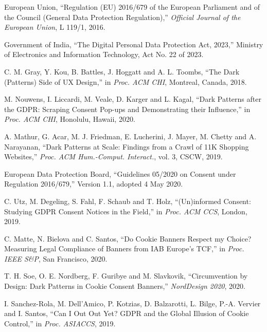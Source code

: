 \documentclass[12pt,a4paper]{report}
\begin{document}
\begin{enumerate}[leftmargin=1.5cm, label={[\arabic*]}]

\item European Union, ``Regulation (EU) 2016/679 of the European Parliament
and of the Council (General Data Protection Regulation),''
\textit{Official Journal of the European Union}, L 119/1, 2016.

\item Government of India, ``The Digital Personal Data Protection Act, 2023,''
Ministry of Electronics and Information Technology, Act No. 22 of 2023.

\item C. M. Gray, Y. Kou, B. Battles, J. Hoggatt and A. L. Toombs,
``The Dark (Patterns) Side of UX Design,''
in \textit{Proc. ACM CHI}, Montreal, Canada, 2018.

\item M. Nouwens, I. Liccardi, M. Veale, D. Karger and L. Kagal,
``Dark Patterns after the GDPR: Scraping Consent Pop-ups and
Demonstrating their Influence,''
in \textit{Proc. ACM CHI}, Honolulu, Hawaii, 2020.

\item A. Mathur, G. Acar, M. J. Friedman, E. Lucherini, J. Mayer,
M. Chetty and A. Narayanan,
``Dark Patterns at Scale: Findings from a Crawl of 11K Shopping Websites,''
\textit{Proc. ACM Hum.-Comput. Interact.}, vol. 3, CSCW, 2019.

\item European Data Protection Board,
``Guidelines 05/2020 on Consent under Regulation 2016/679,''
Version 1.1, adopted 4 May 2020.

\item C. Utz, M. Degeling, S. Fahl, F. Schaub and T. Holz,
``(Un)informed Consent: Studying GDPR Consent Notices in the Field,''
in \textit{Proc. ACM CCS}, London, 2019.

\item C. Matte, N. Bielova and C. Santos,
``Do Cookie Banners Respect my Choice? Measuring Legal Compliance of Banners
from IAB Europe's TCF,''
in \textit{Proc. IEEE S\&P}, San Francisco, 2020.

\item T. H. Soe, O. E. Nordberg, F. Guribye and M. Slavkovik,
``Circumvention by Design: Dark Patterns in Cookie Consent Banners,''
\textit{NordDesign 2020}, 2020.

\item I. Sanchez-Rola, M. Dell'Amico, P. Kotzias, D. Balzarotti,
L. Bilge, P.-A. Vervier and I. Santos,
``Can I Out Out Yet? GDPR and the Global Illusion of Cookie Control,''
in \textit{Proc. ASIACCS}, 2019.


\end{enumerate}
\end{document}
